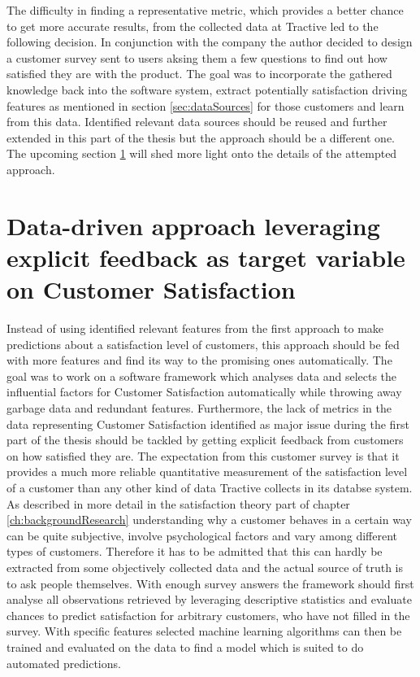 \linebreak
The difficulty in finding a representative metric, which provides a better chance to get more accurate results, from the collected data at Tractive led to the following decision. In conjunction with the company the author decided to design a customer survey sent to users aksing them a few questions to find out how satisfied they are with the product. The goal was to incorporate the gathered knowledge back into the software system, extract potentially satisfaction driving features as mentioned in section \ref{sec:dataSources} for those customers and learn from this data. Identified relevant data sources should be reused and further extended in this part of the thesis but the approach should be a different one. The upcoming section \ref{sec:dataDriven} will shed more light onto the details of the attempted approach. 

\section{Data-driven approach leveraging explicit feedback as target variable on Customer Satisfaction}
\label{sec:dataDriven}
Instead of using identified relevant features from the first approach to make predictions about a satisfaction level of customers, this approach should be fed with more features and find its way to the promising ones automatically. The goal was to work on a software framework which analyses data and selects the influential factors for Customer Satisfaction automatically while throwing away garbage data and redundant features. Furthermore, the lack of metrics in the data representing Customer Satisfaction identified as major issue during the first part of the thesis should be tackled by getting explicit feedback from customers on how satisfied they are. The expectation from this customer survey is that it provides a much more reliable quantitative measurement of the satisfaction level of a customer than any other kind of data Tractive collects in its databse system. As described in more detail in the satisfaction theory part of chapter \ref{ch:backgroundResearch} understanding why a customer behaves in a certain way can be quite subjective, involve psychological factors and vary among different types of customers. Therefore it has to be admitted that this can hardly be extracted from some objectively collected data and the actual source of truth is to ask people themselves. With enough survey answers the framework should first analyse all observations retrieved by leveraging descriptive statistics and evaluate chances to predict satisfaction for arbitrary customers, who have not filled in the survey. With specific features selected machine learning algorithms can then be trained and evaluated on the data to find a model which is suited to do automated predictions. 

